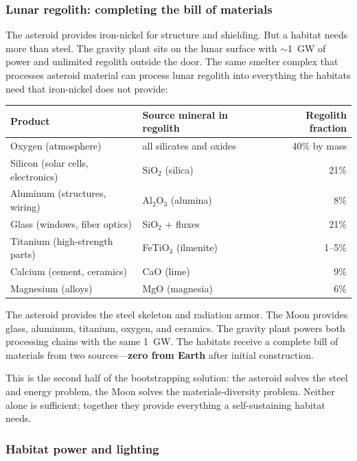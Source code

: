 \documentclass[12pt,letterpaper]{article}
\begin{document}
\subsubsection{Lunar regolith: completing the bill of materials}

The asteroid provides iron-nickel for structure and shielding. But a habitat needs more than steel. The gravity plant sits on the lunar surface with $\sim$1~GW of power and unlimited regolith outside the door. The same smelter complex that processes asteroid material can process lunar regolith into everything the habitats need that iron-nickel does not provide:

\begin{center}
\small
\begin{tabular}{llr}
\toprule
\textbf{Product} & \textbf{Source mineral in regolith} & \textbf{Regolith fraction} \\
\midrule
Oxygen (atmosphere) & all silicates and oxides & 40\% by mass \\
Silicon (solar cells, electronics) & SiO$_2$ (silica) & 21\% \\
Aluminum (structures, wiring) & Al$_2$O$_3$ (alumina) & 8\% \\
Glass (windows, fiber optics) & SiO$_2$ + fluxes & 21\% \\
Titanium (high-strength parts) & FeTiO$_3$ (ilmenite) & 1--5\% \\
Calcium (cement, ceramics) & CaO (lime) & 9\% \\
Magnesium (alloys) & MgO (magnesia) & 6\% \\
\bottomrule
\end{tabular}
\end{center}

The asteroid provides the steel skeleton and radiation armor. The Moon provides glass, aluminum, titanium, oxygen, and ceramics. The gravity plant powers both processing chains with the same 1~GW. The habitats receive a complete bill of materials from two sources---\textbf{zero from Earth} after initial construction.

This is the second half of the bootstrapping solution: the asteroid solves the steel and energy problem, the Moon solves the materials-diversity problem. Neither alone is sufficient; together they provide everything a self-sustaining habitat needs.

\subsubsection{Habitat power and lighting}
\end{document}
